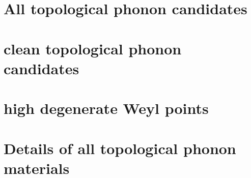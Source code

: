 \documentclass[amsmath,amssymb]{revtex4}
\begin{document}
\section{All topological phonon candidates}

\newpage
\section{clean topological phonon candidates}

\newpage
\section{high degenerate Weyl points}

\section{Details of all topological phonon materials}
















































































\end{document}
